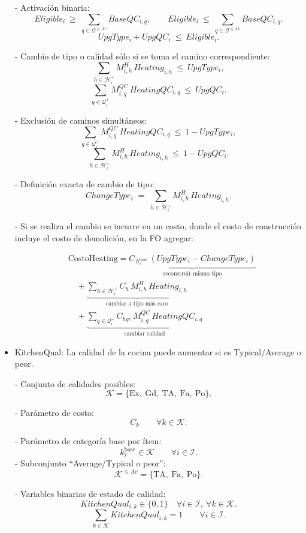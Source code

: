 \begin{itemize}
- Activación binaria:
\[
  Eligible_i \ \ge\ \sum_{q\in\mathcal{Q}^{\le Av}} BaseQC_{i,q},\qquad
  Eligible_i \ \le\ \sum_{q\in\mathcal{Q}^{\le Av}} BaseQC_{i,q}.
\]
\[
  UpgType_i + UpgQC_i \ \le\ Eligible_i.
\]

- Cambio de tipo o calidad sólo si se toma el camino correspondiente:
\[
  \sum_{h\in\mathcal{H}_i^+} M^H_{i,h}\, Heating_{i,h} \ \le\ UpgType_i,
\]
\[
  \sum_{q\in\mathcal{Q}_i^+} M^{QC}_{i,q}\, HeatingQC_{i,q} \ \le\ UpgQC_i.
\]

- Exclusión de caminos simultáneos:
\[
  \sum_{q\in\mathcal{Q}_i^+} M^{QC}_{i,q}\, HeatingQC_{i,q} \ \le\ 1 - UpgType_i,
\]
\[
  \sum_{h\in\mathcal{H}_i^+} M^H_{i,h}\, Heating_{i,h} \ \le\ 1 - UpgQC_i.
\]

- Definición exacta de cambio de tipo:
\[
ChangeType_i \;=\; \sum_{h\in\mathcal{H}_i^+} M^H_{i,h}\, Heating_{i,h}.
\]

- Si se realiza el cambio se incurre en un costo, donde el costo de construcción incluye el costo de demolición, en la FO agregar:

\[
\begin{aligned}
&\text{CostoHeating}
=\underbrace{C_{\,h_i^{\text{base}}}\,(UpgType_i - ChangeType_i)}_{\text{reconstruir mismo tipo}}\\[4pt]
&\quad
+\underbrace{\sum_{h\in\mathcal{H}_i^+} C_h\, M^H_{i,h}\, Heating_{i,h}}_{\text{cambiar a tipo más caro}}\\[4pt]
&\quad
+\underbrace{\sum_{q\in\mathcal{Q}_i^+} C_{hqc}\, M^{QC}_{i,q}\, HeatingQC_{i,q}}_{\text{cambiar calidad}}
\end{aligned}
\]

    \item KitchenQual: La calidad de la cocina puede aumentar si es Typical/Average o peor.

    - Conjunto de calidades posibles:
    \[
      \mathcal{K} = \{\text{Ex},\ \text{Gd},\ \text{TA},\ \text{Fa},\ \text{Po}\}.
    \]

    - Parámetro de costo:
    \[
      C_k \qquad \forall k \in \mathcal{K}.
    \]

    - Parámetro de categoría base por ítem:
    \[
      k_i^{\text{base}} \in \mathcal{K} \qquad \forall i \in \mathcal{I}.
    \]
    - Subconjunto “Average/Typical o peor”:
    \[
      \mathcal{K}^{\le Av} = \{\text{TA},\ \text{Fa},\ \text{Po}\}.
    \]

    - Variables binarias de estado de calidad:
    \[
      KitchenQual_{i,k} \in \{0,1\} \quad \forall i \in \mathcal{I},\ \forall k \in \mathcal{K}.
    \]
    \[
      \sum_{k \in \mathcal{K}} KitchenQual_{i,k} = 1 \qquad \forall i \in \mathcal{I}.
    \]


\end{itemize}
